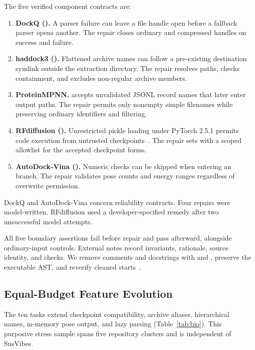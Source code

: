The five verified component contracts are:
\begin{enumerate}[label=\arabic*.]
\item \textbf{DockQ ().} A parser failure can leave a file handle open before a fallback parser opens another. The repair closes ordinary and compressed handles on success and failure.
\item \textbf{haddock3 ().} Flattened archive names can follow a pre-existing destination symlink outside the extraction directory. The repair resolves paths, checks containment, and excludes non-regular archive members.
\item \textbf{ProteinMPNN.}  accepts unvalidated JSONL record names that later enter output paths. The repair permits only nonempty simple filenames while preserving ordinary identifiers and filtering.
\item \textbf{RFdiffusion ().} Unrestricted pickle loading under PyTorch 2.5.1 permits code execution from untrusted checkpoints~\cite{pytorchserialization,pythonpickle}. The repair sets  with a scoped  allowlist for the accepted checkpoint forms.
\item \textbf{AutoDock-Vina ().} Numeric checks can be skipped when entering an  branch. The repair validates pose counts and energy ranges regardless of overwrite permission.
\end{enumerate}
DockQ and AutoDock-Vina concern reliability contracts. Four repairs were model-written. RFdiffusion used a developer-specified remedy after two unsuccessful model attempts.

All five boundary assertions fail before repair and pass afterward, alongside ordinary-input controls. External notes record invariants, rationale, source identity, and checks. We remove comments and docstrings with  and , preserve the executable AST, and reverify cleaned starts~\cite{pythontokenize,pythonast}.

\subsection{Equal-Budget Feature Evolution}
The ten tasks extend checkpoint compatibility, archive aliases, hierarchical names, in-memory pose output, and lazy parsing (Table~\ref{tab:bio}). This purposive stress sample spans five repository clusters and is independent of SusVibes.

